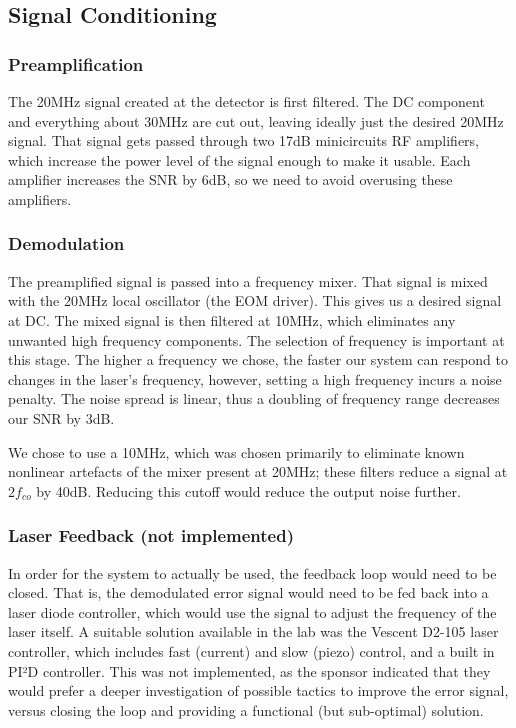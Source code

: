 \subsection{Signal Conditioning}
\label{sec:signalcond}
    \subsubsection{Preamplification}

The 20MHz signal created at the detector is first filtered.  The DC component and everything about 30MHz are cut out, leaving ideally just the desired 20MHz signal.  That signal gets passed through two 17dB minicircuits RF amplifiers, which increase the power level of the signal enough to make it usable.  Each amplifier increases the SNR by 6dB, so we need to avoid overusing these amplifiers.

    \subsubsection{Demodulation}

The preamplified signal is passed into a frequency mixer.  That signal is mixed with the 20MHz local oscillator (the EOM driver).  This gives us a desired signal at DC.  The mixed signal is then filtered at 10MHz, which eliminates any unwanted high frequency components.  The selection of frequency is important at this stage.  The higher a frequency we chose, the faster our system can respond to changes in the laser's frequency, however, setting a high frequency incurs a noise penalty.  The noise spread is linear, thus a doubling of frequency range decreases our SNR by 3dB.

We chose to use a 10MHz, which was chosen primarily to eliminate known nonlinear artefacts of the mixer present at 20MHz; these filters reduce a signal at $2f_{co}$ by 40dB\cite{zfl_1000}.  Reducing this cutoff would reduce the output noise further.

    \subsubsection{Laser Feedback (not implemented)}

In order for the system to actually be used, the feedback loop would need to be closed.  That is, the demodulated error signal would need to be fed back into a laser diode controller, which would use the signal to adjust the frequency of the laser itself.  A suitable solution available in the lab was the Vescent D2-105 laser controller, which includes fast (current) and slow (piezo) control, and a built in PI²D controller.  This was not implemented, as the sponsor indicated that they would prefer a deeper investigation of possible tactics to improve the error signal, versus closing the loop and providing a functional (but sub-optimal) solution.

